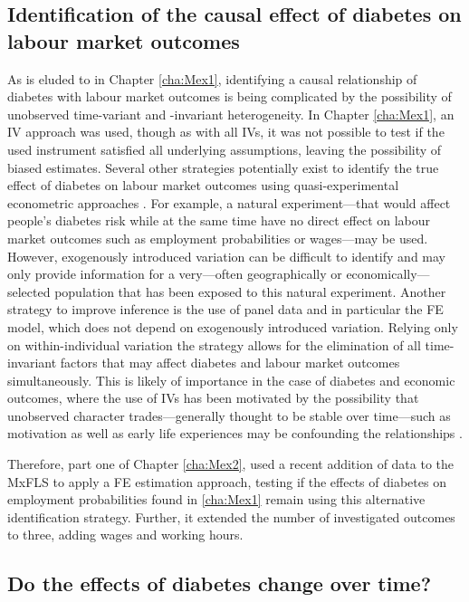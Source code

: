 \subsection{Identification of the causal effect of diabetes on labour market outcomes}

As is eluded to in Chapter \ref{cha:Mex1}, identifying a causal relationship of diabetes with labour market outcomes is being complicated by the possibility of unobserved time-variant and -invariant heterogeneity. In Chapter \ref{cha:Mex1}, an \ac{IV} approach was used, though as with all \acp{IV}, it was not possible to test if the used instrument satisfied all underlying assumptions, leaving the possibility of biased estimates. Several other strategies potentially exist to identify the true effect of diabetes on labour market outcomes using quasi-experimental econometric approaches \parencite{Antonakis2012}. For example, a natural experiment---that would affect people's diabetes risk while at the same time have no direct effect on labour market outcomes such as employment probabilities or wages---may be used. However, exogenously introduced variation can be difficult to identify and may only provide information for a very---often geographically or economically---selected population that has been exposed to this natural experiment. Another strategy to improve inference is the use of panel data and in particular the \ac{FE} model, which does not depend on exogenously introduced variation. Relying only on within-individual variation the strategy allows for the elimination of all time-invariant factors that may affect diabetes and labour market outcomes simultaneously. This is likely of importance in the case of diabetes and economic outcomes, where the use of \ac{IV}s has been motivated by the possibility that unobserved character trades---generally thought to be stable over time---such as motivation as well as early life experiences may be confounding the relationships \parencite{Seuring2015}.

Therefore, part one of Chapter \ref{cha:Mex2}, used a recent addition of data to the \ac{MxFLS} to apply a \ac{FE} estimation approach, testing if the effects of diabetes on employment probabilities found in \ref{cha:Mex1} remain using this alternative identification strategy. Further, it extended the number of investigated outcomes to three, adding wages and working hours.

\subsection{Do the effects of diabetes change over time?}

